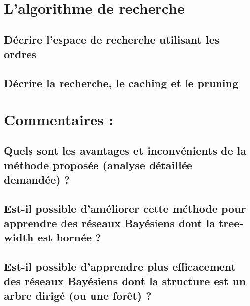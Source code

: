 \documentclass[french,a4paper]{article}
\begin{document}
\section{L'algorithme de recherche}
\subsection{Décrire l'espace de recherche utilisant les ordres}


\subsection{Décrire la recherche, le caching et le pruning}


\section{Commentaires :}
\subsection{Quels sont les avantages et inconvénients de la méthode proposée (analyse détaillée demandée) ?}
\subsection{Est-il possible d'améliorer cette méthode pour apprendre des réseaux Bayésiens dont la tree-width est bornée ?}
\subsection{Est-il possible d'apprendre plus efficacement des réseaux Bayésiens dont la structure est un arbre dirigé (ou une forêt) ?}
\end{document}
